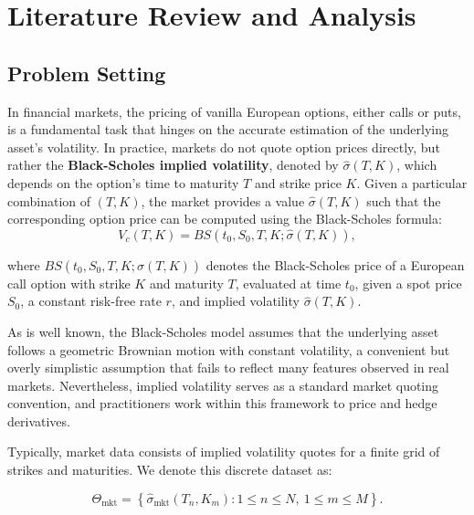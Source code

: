 \section{Literature Review and Analysis}

\subsection{Problem Setting}

In financial markets, the pricing of vanilla European options, either calls or puts, is a fundamental task that hinges on the accurate estimation of the underlying asset's volatility.
In practice, markets do not quote option prices directly, but rather the \textbf{Black-Scholes implied volatility}, denoted by $\hat{\sigma}(T, K)$, which depends on the option's time to maturity $T$ and strike price $K$.
Given a particular combination of $(T, K)$, the market provides a value $\hat{\sigma}(T, K)$ such that the corresponding option price can be computed using the Black-Scholes formula:
\begin{equation}
    V_c(T,K) = BS(t_0, S_0, T, K; \hat{\sigma}(T,K)),
\end{equation}

where $BS(t_0, S_0, T, K; \hat{\sigma}(T,K))$ denotes the Black-Scholes price of a European call option with strike $K$ and maturity $T$, evaluated at time $t_0$, given a spot price $S_0$, a constant risk-free rate $r$, and implied volatility $\hat{\sigma}(T, K)$.

As is well known, the Black-Scholes model assumes that the underlying asset follows a geometric Brownian motion with constant volatility, a convenient but overly simplistic assumption that fails to reflect many features observed in real markets. Nevertheless, implied volatility serves as a standard market quoting convention, and practitioners work within this framework to price and hedge derivatives.

Typically, market data consists of implied volatility quotes for a finite grid of strikes and maturities. We denote this discrete dataset as:

\begin{equation}
    \Theta_{\text{mkt}} = \left\{ \hat{\sigma}_{\text{mkt}}(T_n, K_m) : 1 \leq n \leq N,\ 1 \leq m \leq M \right\}.
\end{equation}

